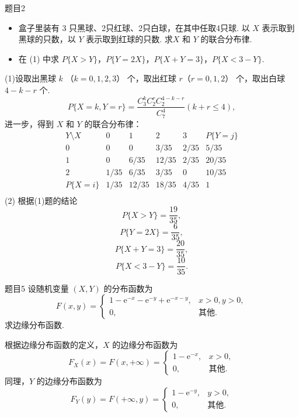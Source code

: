 \begin{question}{题目2}
    \begin{itemize}
        \item [(1)] 盒子里装有 3 只黑球、2只红球、2只白球，在其中任取4只球. 以 $X$ 表示取到黑球的只数，以 $Y$ 表示取到红球的只数. 求$X$ 和 $Y$ 的联合分布律.
        \item [(2)] 在 (1) 中求 $P\{X>Y\}$，$P\{Y=2X\}$，$P\{X+Y=3\}$，$P\{X<3-Y\}$.
    \end{itemize}
\end{question}
\begin{solution}
    (1)设取出黑球 $k$ （$k=0,1,2,3$） 个，取出红球 $r$（$r=0,1,2$） 个，取出白球 $4-k-r$ 个.
    $$
        P\{X=k, Y=r\} = \frac{C_3^kC_2^rC_2^{4-k-r}}{C_7^4}
        (k + r \leqslant 4),
    $$
    进一步，得到 $X$ 和 $Y$ 的联合分布律：
    $$
        \begin{array}{c|cccc|c}
            Y \setminus X & 0    & 1     & 2     & 3    & P\{Y=j\} \\
            \hline
            0             & 0    & 0     & 3/35  & 2/35 & 5/35     \\
            1             & 0    & 6/35  & 12/35 & 2/35 & 20/35    \\
            2             & 1/35 & 6/35  & 3/35  & 0    & 10/35    \\
            \hline
            P\{X=i\}      & 1/35 & 12/35 & 18/35 & 4/35 & 1        \\
        \end{array}
    $$
    (2) 根据(1)题的结论
    $$
        P\{X>Y\} = \frac{19}{35},
    $$
    $$
        P\{Y=2X\} = \frac{6}{35},
    $$
    $$
        P\{X+Y=3\} = \frac{20}{35},
    $$
    $$
        P\{X<3-Y\} = \frac{10}{35}.
    $$
\end{solution}

\begin{question}{题目5}
    设随机变量 $(X,Y)$ 的分布函数为
    $$
        F(x,y) = \begin{cases}
            1-\mathrm{e}^{-x}-\mathrm{e}^{-y}+\mathrm{e}^{-x-y}, & x>0,y>0,   \\
            0,                                                   & \text{其他}.
        \end{cases}
    $$
    求边缘分布函数.
\end{question}
\begin{solution}
    根据边缘分布函数的定义，$X$ 的边缘分布函数为
    $$
        F_X(x) = F(x, +\infty) =
        \begin{cases}
            1 - \mathrm{e}^{-x}, & x>0,       \\
            0,                   & \text{其他}.
        \end{cases}
    $$
    同理，$Y$ 的边缘分布函数为
    $$
        F_Y(y) = F(+\infty, y) =
        \begin{cases}
            1 - \mathrm{e}^{-y}, & y>0,       \\
            0,                   & \text{其他}.
        \end{cases}
    $$
\end{solution}


